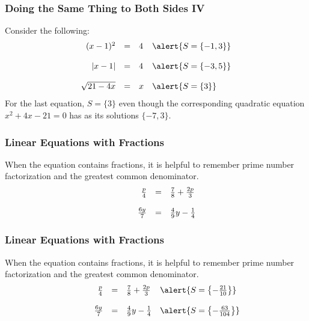 \documentclass[xcolor=dvipsnames]{beamer}
\begin{document}
\begin{frame}
  \frametitle{Doing the Same Thing to Both Sides IV}
Consider the following:
\begin{equation}
  \label{eq:peihahto}
  \begin{array}{rcll}
    (x-1)^{2}&=&4&\alert{S=\{-1,3\}} \\
\hspace{.5in} &&& \\
    |x-1|&=&4&\alert{S=\{-3,5\}} \\
\hspace{.5in} &&& \\
    \sqrt{21-4x}&=&x&\alert{S=\{3\}}
  \end{array}
\end{equation}
For the last equation, $S=\{3\}$ even though the corresponding
quadratic equation $x^{2}+4x-21=0$ has as its solutions $\{-7,3\}$.
\end{frame}

\begin{frame}
  \frametitle{Linear Equations with Fractions}
When the equation contains fractions, it is helpful to remember prime
number factorization and the greatest common denominator.
\begin{equation}
  \label{eq:sheekahf}
  \begin{array}{rcl}
\frac{p}{4}&=&\frac{7}{8}+\frac{2p}{3} \\
\hspace{.5in} && \\
\frac{6y}{7}&=&\frac{4}{9}y-\frac{1}{4} \\
  \end{array}
\end{equation}
\end{frame}

\begin{frame}
  \frametitle{Linear Equations with Fractions}
When the equation contains fractions, it is helpful to remember prime
number factorization and the greatest common denominator.
\begin{equation}
  \label{eq:xiupaete}
  \begin{array}{rcll}
\frac{p}{4}&=&\frac{7}{8}+\frac{2p}{3}&\alert{S=\left\{-\frac{21}{10}\right\}} \\
\hspace{.5in} && \\
\frac{6y}{7}&=&\frac{4}{9}y-\frac{1}{4}&\alert{S=\left\{-\frac{63}{104}\right\}} \\
  \end{array}
\end{equation}
\end{frame}
\end{document}
